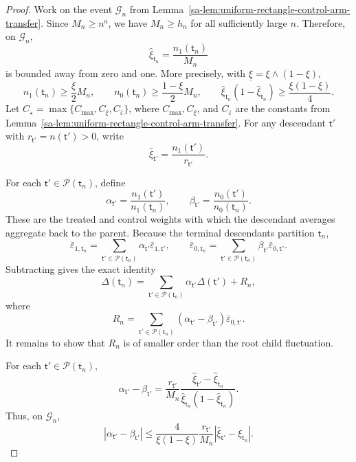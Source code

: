 \documentclass[10pt,a4paper]{amsart}
\def\nodet{\mathsf{t}}
\begin{document}
\begin{proof}
Work on the event $\mathcal G_n$ from Lemma~\ref{sa-lem:uniform-rectangle-control-arm-transfer}. Since $M_n\geq n^a$, we have $M_n\geq h_n$ for all sufficiently large $n$. Therefore, on $\mathcal G_n$,
\[
    \hat\xi_{\nodet_n}
    =
    \frac{n_1(\nodet_n)}{M_n}
\]
is bounded away from zero and one. More precisely, with $\underline\xi=\xi\wedge(1-\xi)$,
\[
    n_1(\nodet_n)\geq \frac{\xi}{2}M_n,
    \qquad
    n_0(\nodet_n)\geq \frac{1-\xi}{2}M_n,
    \qquad
    \hat\xi_{\nodet_n}(1-\hat\xi_{\nodet_n})
    \geq
    \frac{\xi(1-\xi)}{4}.
\]
Let $C_\star=\max\{C_{\max},C_{\xi},C_{\bar\varepsilon}\}$, where
$C_{\max},C_{\xi}$, and $C_{\bar\varepsilon}$ are the constants from
Lemma~\ref{sa-lem:uniform-rectangle-control-arm-transfer}.
For any descendant $\nodet'$ with
$r_{\nodet'}=n(\nodet')>0$, write
\[
    \hat\xi_{\nodet'}
    =
    \frac{n_1(\nodet')}{r_{\nodet'}}.
\]

For each $\nodet'\in\mathcal P(\nodet_n)$, define
\[
    \alpha_{\nodet'}
    =
    \frac{n_1(\nodet')}{n_1(\nodet_n)},
    \qquad
    \beta_{\nodet'}
    =
    \frac{n_0(\nodet')}{n_0(\nodet_n)}.
\]
These are the treated and control weights with which the descendant averages
aggregate back to the parent. Because the terminal descendants partition
$\nodet_n$,
\[
    \bar\varepsilon_{1,\nodet_n}
    =
    \sum_{\nodet'\in\mathcal P(\nodet_n)}
    \alpha_{\nodet'}\bar\varepsilon_{1,\nodet'},
    \qquad
    \bar\varepsilon_{0,\nodet_n}
    =
    \sum_{\nodet'\in\mathcal P(\nodet_n)}
    \beta_{\nodet'}\bar\varepsilon_{0,\nodet'}.
\]
Subtracting gives the exact identity
\[
    \Delta(\nodet_n)
    =
    \sum_{\nodet'\in\mathcal P(\nodet_n)}
    \alpha_{\nodet'}\Delta(\nodet')
    +
    R_n,
\]
where
\[
    R_n
    =
    \sum_{\nodet'\in\mathcal P(\nodet_n)}
    (\alpha_{\nodet'}-\beta_{\nodet'})
    \bar\varepsilon_{0,\nodet'}.
\]
It remains to show that $R_n$ is of smaller order than the root child fluctuation.

For each $\nodet'\in\mathcal P(\nodet_n)$,
\[
    \alpha_{\nodet'}-\beta_{\nodet'}
    =
    \frac{r_{\nodet'}}{M_n}
    \frac{\hat\xi_{\nodet'}-\hat\xi_{\nodet_n}}
         {\hat\xi_{\nodet_n}(1-\hat\xi_{\nodet_n})}.
\]
Thus, on $\mathcal G_n$,
\[
    |\alpha_{\nodet'}-\beta_{\nodet'}|
    \leq
    \frac{4}{\xi(1-\xi)}
    \frac{r_{\nodet'}}{M_n}
    |\hat\xi_{\nodet'}-\hat\xi_{\nodet_n}|.
\]


\end{proof}
\end{document}
